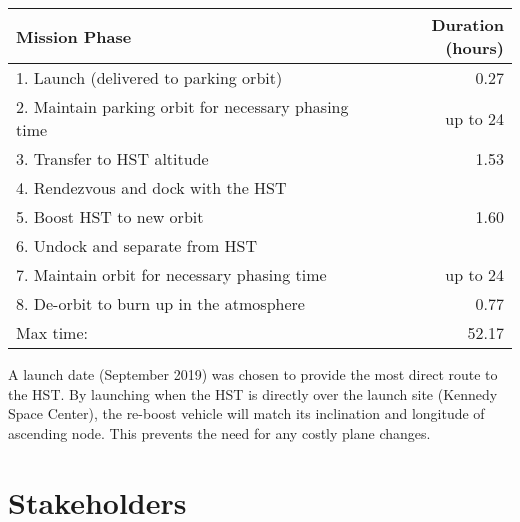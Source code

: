 \documentclass[onecolumn,10pt]{jhwhw}
\begin{document}
\begin{table}[h!]
\begin{center}
\begin{tabular}{l r}
\toprule
Mission Phase & Duration (hours) \\
\midrule
1. Launch (delivered to parking orbit) & 0.27 \\
2. Maintain parking orbit for necessary phasing time & up to 24 \\
3. Transfer to HST altitude & 1.53 \\
4. Rendezvous and dock with the HST &  \\
5. Boost HST to new orbit & 1.60 \\
6. Undock and separate from HST &  \\
7. Maintain orbit for necessary phasing time & up to 24 \\
8. De-orbit to burn up in the atmosphere & 0.77 \\
\bottomrule
Max time: & 52.17 \\
\bottomrule
\end{tabular}
\end{center}
\end{table}

A launch date (September 2019) was chosen to provide the most direct route to the HST. By launching when the HST is directly over the launch site (Kennedy Space Center), the re-boost vehicle will match its inclination and longitude of ascending node. This prevents the need for any costly plane changes.

\section{Stakeholders}
\end{document}
